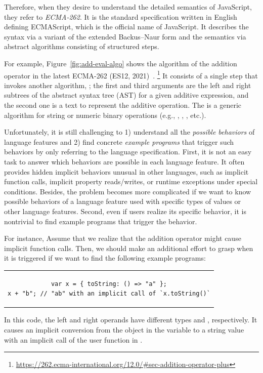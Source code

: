 Therefore, when they desire to understand the detailed semantics of JavaScript,
they refer to \textit{ECMA-262}.  It is the standard specification written in
English defining ECMAScript, which is the official name of JavaScript.  It
describes the syntax via a variant of the extended Backus–Naur form and the
semantics via abstract algorithms consisting of structured steps.

For example, Figure~\ref{fig:add-eval-algo} shows the 
algorithm of the addition operator in the latest ECMA-262 (ES12,
2021)~\cite{es12}.
\footnote{\url{https://262.ecma-international.org/12.0/\#sec-addition-operator-plus}}
It consists of a single step that invokes another algorithm,
; the first and third arguments
are the left and right subtrees of the abstract syntax tree (AST) for a given
additive expression, and the second one is a text \code{+} to represent the
additive operation.  The  is a
generic algorithm for string or numeric binary operations (e.g., \code{-},
\code{*}, \code{<}, etc.).

Unfortunately, it is still challenging to 1) understand all the \textit{possible
behaviors} of language features and 2) find concrete \textit{example programs}
that trigger such behaviors by only referring to the language specification.
First, it is not an easy task to answer which behaviors are possible in each
language feature.  It often provides hidden implicit behaviors unusual in other
languages, such as implicit function calls, implicit property reads/writes, or
runtime exceptions under special conditions.  Besides, the problem becomes more
complicated if we want to know possible behaviors of a language feature used
with specific types of values or other language features.  Second, even if users
realize its specific behavior, it is nontrivial to find example programs that
trigger the behavior.

For instance, Assume that we realize that the addition operator might cause
implicit function calls.  Then, we should make an additional effort to grasp
when it is triggered if we want to find the following example programs:
\begin{center}
  \begin{tabular}{c}
    \begin{lstlisting}[style=JS]
var x = { toString: () => "a" };
x + "b"; // "ab" with an implicit call of `x.toString()`
    \end{lstlisting}
  \end{tabular}
\end{center}
In this code, the left and right operands have different types  and
, respectively.  It causes an implicit conversion from the object
in the variable  to a string value with an implicit call of the user
function in .

